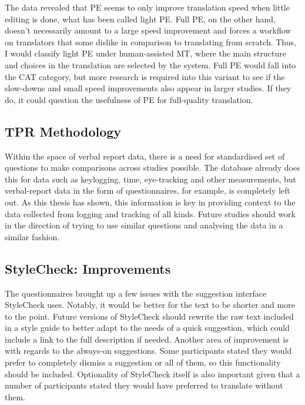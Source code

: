 \noindent The data revealed that \ac{PE} seems to only improve translation speed when little editing is done, what has been called light \ac{PE}. Full \ac{PE}, on the other hand, doesn't necessarily amount to a large speed improvement and forces a workflow on translators that some dislike in comparison to translating from scratch. Thus, I would classify light \ac{PE} under human-assisted \ac{MT}, where the main structure and choices in the translation are selected by the system. Full \ac{PE} would fall into the \ac{CAT} category, but more research is required into this variant to see if the slow-downs and small speed improvements also appear in larger studies. If they do, it could question the usefulness of \ac{PE} for full-quality translation.

\subsection{TPR Methodology}

\noindent Within the space of verbal report data, there is a need for standardised set of questions to make comparisons across studies possible. The  \parencite{carl2012critt} database already does this for data such as keylogging, time, eye-tracking and other measurements, but verbal-report data in the form of questionnaires, for example, is completely left out. As this thesis has shown, this information is key in providing context to the data collected from logging and tracking of all kinds. Future studies should work in the direction of trying to use similar questions and analysing the data in a similar fashion.

\subsection{StyleCheck: Improvements}

\noindent The questionnaires brought up a few issues with the suggestion interface StyleCheck uses. Notably, it would be better for the text to be shorter and more to the point. Future versions of StyleCheck should rewrite the raw text included in a style guide to better adapt to the needs of a quick suggestion, which could include a link to the full description if needed. Another area of improvement is with regards to the always-on suggestions. Some participants stated they would prefer to completely dismiss a suggestion or all of them, so this functionality should be included. Optionality of StyleCheck itself is also important given that a number of participants stated they would have preferred to translate without them. 


